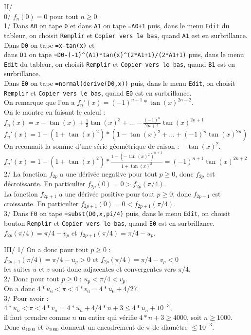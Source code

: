 \documentclass[a4paper,11pt]{book}
\begin{document}
II/\\
0/ $f_n(0)=0$ pour tout $n \geq 0$.\\
1/ Dans {\tt A0} on tape {\tt  0} et dans {\tt A1} on tape {\tt =A0+1}
 puis, dans le menu {\tt Edit} du tableur, on choisit {\tt Remplir}  et 
{\tt Copier vers le bas}, quand {\tt A1} est en surbrillance.\\
Dans {\tt D0} on tape {\tt =x-tan(x)} et \\
dans {\tt D1} on tape 
{\tt =D0-(-1)\verb|^|(A1)*tan(x)\verb|^|(2*A1+1)/(2*A1+1)}
puis, dans le menu {\tt Edit} du tableur, on choisit {\tt Remplir}  et 
{\tt Copier vers le bas}, quand {\tt B1} est en surbrillance.\\
Dans {\tt E0} on tape {\tt =normal(derive(D0,x))} puis, dans le menu 
{\tt Edit}, on choisit {\tt Remplir}  et {\tt Copier vers le bas}, quand 
{\tt  E0} est en surbrillance.\\
On remarque que l'on a $f_n'(x)=(-1)^{n+1}*\tan(x)^{2n+2}$.\\
On le montre en faisant le calcul :\\
$\displaystyle f_n(x)=x-\tan(x)+\frac{1}{3}\tan(x)^3+...-\frac{(-1)^n}{2n+1}\tan(x)^{2n+1}$\\
$f_n'(x)=1-(1+\tan(x)^2)*(1-\tan(x)^2+...+(-1)^n\tan(x)^{2n})$\\
On reconnait la somme d'une s\'erie g\'eom\'etrique de raison : $-\tan(x)^2$.\\
$\displaystyle f_n'(x)=1-(1+\tan(x)^2)*\frac{1-(-\tan(x)^2)^{n+1}}{1+\tan(x)^2}=(-1)^{n+1}\tan(x)^{2n+2}$\\
2/ La fonction $f_{2p}$ a une d\'eriv\'ee negative pour tout $p \geq 0$, donc 
$f_{2p}$ est d\'ecroissante. En particulier $f_{2p}(0)=0>f_{2p}(\pi/4)$.\\
La fonction $f_{2p+1}$ a une d\'eriv\'ee positive pour tout $p \geq 0$, donc 
$f_{2p+1}$ est croissante. En particulier $f_{2p+1}(0)=0<f_{2p+1}(\pi/4)$.\\
3/ Dans {\tt F0} on tape {\tt =subst(D0,x,pi/4)} puis, dans le menu {\tt Edit},
on choisit  bouton {\tt Remplir}  et {\tt Copier vers le bas}, quand {\tt E0} 
est en surbrillance.\\
$f_{2p}(\pi/4)=\pi/4-v_p$ et $f_{2p+1}(\pi/4)=\pi/4-u_p$.

III/
1/ On a donc pour tout $p \geq 0$ :\\
$f_{2p+1}(\pi/4)=\pi/4-u_p>0$ et $f_{2p}(\pi/4)=\pi/4-v_p<0$\\
les suites $u$ et $v$ sont donc adjacentes et convergentes vers $\pi/4$.\\
2/ Donc pour tout $p \geq 0$ : $u_p<\pi/4<v_p$.\\ 
On a donc $4*u_6<\pi<4*v_6=4*u_6+4/27$.\\
3/ Pour avoir :\\
 $4*u_n<\pi<4*v_n=4*u_n+4/4*n+3 \leq 4*u_n+10^{-3}$, \\
il faut prendre comme $n$ un entier qui v\'erifie $4*n+3 \geq 4000$, soit $n \geq 1000$.\\
Donc $u_{1000}$ et $v_{1000}$ donnent un encadrement de $\pi$ de diam\`etre $\leq 10^{-3}$.
\end{document}
